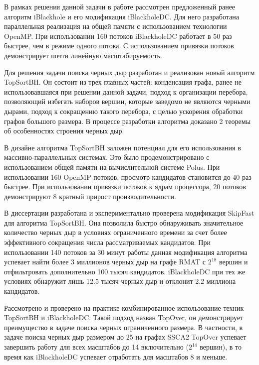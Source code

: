 \documentclass[12pt,a4paper,oneside,openany]{article}
\theoremstyle{definition}
\theoremstyle{lemma}
\theoremstyle{remark}
\begin{document}
В рамках решения данной задачи в работе рассмотрен предложенный ранее алгоритм iBlackhole и его модификация
iBlackholeDC. Для него разработана параллельная реализация на общей памяти с использованием технологии OpenMP. При использовании 160 потоков iBlackholeDC
работает в 50 раз быстрее, чем в режиме одного потока. С использованием привязки потоков демонстрирует
почти линейную масштабируемость.

Для решения задачи поиска черных дыр разработан и реализован новый алгоритм TopSortBH.
Он состоит из трех главных частей: конденсация графа, ранее не
использовавшаяся при решении данной задачи, подход к организации перебора,
позволяющий избегать наборов вершин, которые заведомо не являются черными дырами,
подход к сокращению такого перебора, с целью ускорения обработки графов большого размера.
В процессе разработки алгоритма доказано 2 теоремы об особенностях строения черных дыр.

В дизайне алгоритма TopSortBH заложен потенциал для его использования в
массивно-параллельных системах. Это было продемонстрировано с использованием общей памяти на вычислительной системе Polus.
При использовании 160 OpenMP-потоков, просмотр кандидатов становится до 40 раз быстрее.
При использовании привязки потоков к ядрам процессора, 20 потоков демонстрируют 8 кратный прирост производительности.

В диссертации разработана и экспериментально проверена модификация SkipFast для алгоритма TopSortBH. Она позволила быстро
обнаруживать значительное количество черных дыр в условиях ограниченного времени за счет более эффективного сокращения числа рассматриваемых кандидатов.
При использовании 140 потоков за 30 минут работы данная модификация алгоритма успевает найти более 3 миллионов черных дыр на графе RMAT с $2^{18}$ вершин и
отфильтровать дополнительно 100 тысяч кандидатов. iBlackholeDC при тех же условиях обнаружит лишь 12.5 тысяч черных дыр и отклонит 2.2 миллиона кандидатов.

Рассмотрено и проверено на практике комбинированное использование техник TopSortBH и iBlackholeDC. Такой подход назван TopOver, он демонстрирует преимущество в задаче поиска черных ограниченного размера.
В частности, в задаче поиска черных дыр размером до 25 на графах SSCA2 TopOver успевает
завершить работу для всех масштабов до 14 включительно ($2^{14}$ вершин), в то время как iBlackholeDC успевает отработать для масштабов 8 и меньше.
\end{document}
